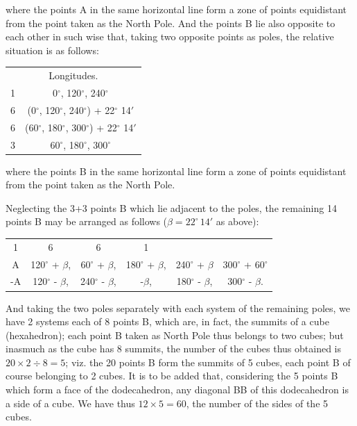 \documentclass[12pt,a4paper]{article}
\theoremstyle{cayley}
\theoremstyle{definition}
\numberwithin{equation}{section}
\begin{document}
where the points A in the same horizontal line form a zone of points equidistant from the point taken as the North Pole. And the points B lie also opposite to each other in such wise that, taking two opposite points as poles, the relative situation is as follows:

\begin{center}
\begin{tabular}{cc}
\multicolumn{2}{c}{Longitudes.} \\
1 \quad 3 & 0$^\circ$, 120$^\circ$, 240$^\circ$ \\
6 & (0$^\circ$, 120$^\circ$, 240$^\circ$) + 22$^\circ$ 14$'$ \\
6 & (60$^\circ$, 180$^\circ$, 300$^\circ$) + 22$^\circ$ 14$'$ \\
3 & 60$^\circ$, 180$^\circ$, 300$^\circ$ \\
\end{tabular}
\end{center}

where the points B in the same horizontal line form a zone of points equidistant from the point taken as the North Pole.

Neglecting the 3+3 points B which lie adjacent to the poles, the remaining 14 points B may be arranged as follows ($\beta = 22^\circ\, 14'$ as above):

\begin{center}
\begin{tabular}{cccccc}
1 & 6 & 6 & 1 \\
A & 120$^\circ$ + $\beta$, & 60$^\circ$ + $\beta$, & 180$^\circ$ + $\beta$, & 240$^\circ$ + $\beta$ & 300$^\circ$ + 60$^\circ$ \\
-A & 120$^\circ$ - $\beta$, & 240$^\circ$ - $\beta$, & -$\beta$, & 180$^\circ$ - $\beta$, & 300$^\circ$ - $\beta$.
\end{tabular}
\end{center}

And taking the two poles separately with each system of the remaining poles, we have 2 systems each of 8 points B, which are, in fact, the summits of a cube (hexahedron); each point B taken as North Pole thus belongs to two cubes; but inasmuch as the cube has 8 summits, the number of the cubes thus obtained is $20 \times 2 \div 8 = 5$; viz. the 20 points B form the summits of 5 cubes, each point B of course belonging to 2 cubes. It is to be added that, considering the 5 points B which form a face of the dodecahedron, any diagonal BB of this dodecahedron is a side of a cube. We have thus $12 \times 5 = 60$, the number of the sides of the 5 cubes.
\end{document}
